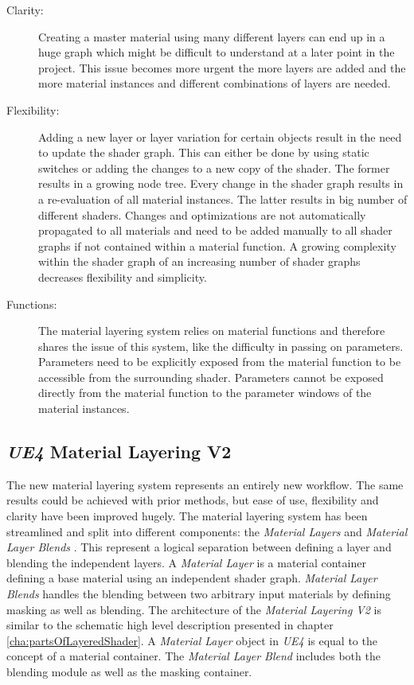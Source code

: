 \begin{description}
	\item [Clarity:] Creating a master material using many different layers can end up in a huge graph which might be difficult to understand at a later point in the project. This issue becomes more urgent the more layers are added and the more material instances and different combinations of layers are needed. 
	\item [Flexibility:] Adding a new layer or layer variation for certain objects result in the need to update the shader graph. This can either be done by using static switches or adding the changes to a new copy of the shader. The former results in a growing node tree. Every change in the shader graph results in a re-evaluation of all material instances. The latter results in big number of different shaders. Changes and optimizations are not automatically propagated to all materials and need to be added manually to all shader graphs if not contained within a material function. A growing complexity within the shader graph of an increasing number of shader graphs decreases flexibility and simplicity. 
	\item [Functions:] The material layering system relies on material functions and therefore shares the issue of this system, like the difficulty in passing on parameters. Parameters need to be explicitly exposed from the material function to be accessible from the surrounding shader. Parameters cannot be exposed directly from the material function to the parameter windows of the material instances.      
\end{description}


\subsection{\emph{UE4} Material Layering V2}\label{sec:matLayV2}

The new material layering system represents an entirely new workflow. The same results could be achieved with prior methods, but ease of use, flexibility and clarity have been improved hugely. The material layering system has been streamlined and split into different components: the \emph{Material Layers} and \emph{Material Layer Blends} \cite{epic2015materialLayers}. This represent a logical separation between defining a layer and blending the independent layers. A \emph{Material Layer} is a material container defining a base material using an independent shader graph. \emph{Material Layer Blends} handles the blending between two arbitrary input materials by defining masking as well as blending. The architecture of the \emph{Material Layering V2} is similar to the schematic high level description presented in chapter \ref{cha:partsOfLayeredShader}.  A \emph{Material Layer} object in \emph{UE4} is equal to the concept of a material container. The \emph{Material Layer Blend} includes both the blending module as well as the masking container. 

